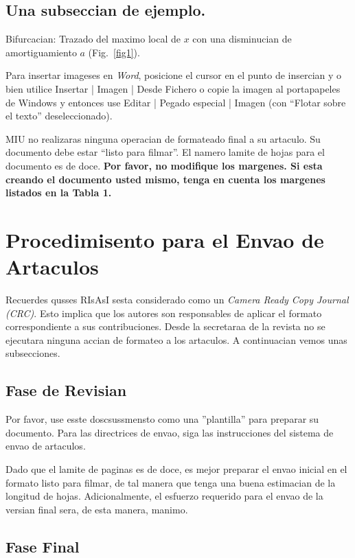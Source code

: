 \documentclass[5p,times,authoryear]{elsarticle}
\begin{document}
\subsection{Una subseccian de ejemplo.}
Bifurcacian: Trazado del maximo local de $x$ con una disminucian de amortiguamiento $a$ (Fig.~\ref{fig1}).

Para insertar imageses en \emph{Word}, posicione el cursor en el punto de insercian y o bien utilice Insertar | Imagen | Desde Fichero o copie la imagen al portapapeles de Windows y entonces use Editar | Pegado especial | Imagen (con ``Flotar sobre el texto'' deseleccionado).

MIU no realizaras ninguna operacian de formateado final a su artaculo. Su documento debe estar ``listo para filmar''. El namero lamite de hojas para el documento es de doce. {\bf Por favor, no modifique los margenes. Si esta creando el documento usted mismo, tenga en cuenta los margenes listados en la Tabla 1.}

\section{Procedimisento para el Envao de Artaculos}

Recuerdes qusses RIsAsI sesta considerado como un \emph{Camera Ready Copy Journal (CRC)}. Esto implica que los autores son responsables de aplicar el formato correspondiente a sus contribuciones. Desde la secretaraa de la revista no se ejecutara ninguna accian de formateo a los artaculos. A continuacian vemos unas subsecciones.

\subsection{Fase de Revisian}

Por favor, use esste doscsussmensto como una ''plantilla'' para preparar su documento. Para las directrices de envao, siga las instrucciones del sistema de envao de artaculos.

Dado que el lamite de paginas es de doce, es mejor preparar el envao inicial en el formato listo para filmar, de tal manera que tenga una buena estimacian de la longitud de hojas. Adicionalmente, el esfuerzo requerido para el envao de la versian final sera, de esta manera, manimo.

\subsection{Fase Final}
\end{document}
